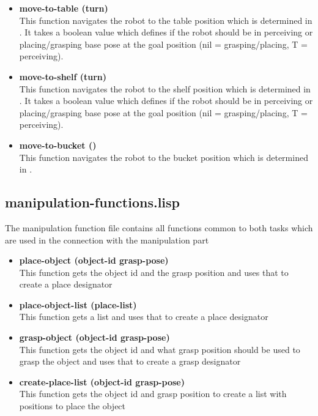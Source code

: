 \documentclass[main.tex]{subfiles}
\begin{document}
\begin{itemize}
	    \item \textbf{move-to-table (turn)} \\
	    This function navigates the robot to the table position which is determined in . It takes a boolean value which defines if the robot should be in perceiving or placing/grasping base pose at the goal position (nil = grasping/placing, T = perceiving). 
	    \item \textbf{move-to-shelf (turn)} \\
	    This function navigates the robot to the shelf position which is determined in . It takes a boolean value which defines if the robot should be in perceiving or placing/grasping base pose at the goal position (nil = grasping/placing, T = perceiving).
	    \item \textbf{move-to-bucket ()} \\
	    This function navigates the robot to the bucket position which is determined in .  
		\end{itemize}
	    \subsection{manipulation-functions.lisp}
	    \label{manipulation}
	    The manipulation function file contains all functions common to both tasks which are used in the connection with the manipulation part
	    \begin{itemize}
	    \item \textbf{place-object (object-id grasp-pose)} \\
	    This function gets the object id and the grasp position and uses that to create a place designator  
		\item \textbf{place-object-list (place-list)} \\
		This function gets a list and uses that to create a place designator 
	    \item \textbf{grasp-object (object-id grasp-pose)} \\
	    This function gets the object id and what grasp position should be used to grasp the object and uses that to create a grasp designator
	    \item \textbf{create-place-list (object-id grasp-pose)} \\
	    This function gets the object id and grasp position to create a list with positions to place the object
		\end{itemize}
\end{document}
